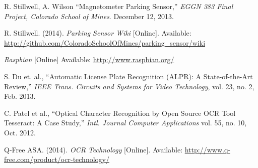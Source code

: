 \documentclass[11pt, oneside, fullpage, doublespace]{article}
\begin{document}
\begin{thebibliography}{99}
 R. Stillwell, A. Wilson ``Magnetometer Parking Sensor,'' \emph{EGGN 383 Final Project, Colorado School of Mines}. December 12, 2013.

 R. Stillwell. (2014). \emph{Parking Sensor Wiki} [Online]. Available: \url{http://github.com/ColoradoSchoolOfMines/parking_sensor/wiki}

 \emph{Raspbian} [Online] Available: \url{http://www.raspbian.org/}

 S. Du et. al., ``Automatic License Plate Recognition (ALPR): A State-of-the-Art Review,'' \emph{IEEE Trans. Circuits and Systems for Video Technology}, vol. 23, no. 2, Feb. 2013.

 C. Patel et al., ``Optical Character Recognition by Open Source OCR Tool Tesseract: A Case Study,'' \emph{Intl. Journal Computer Applications} vol. 55, no. 10, Oct. 2012.

 Q-Free ASA. (2014). \emph{OCR Technology} [Online]. Available: \url{http://www.q-free.com/product/ocr-technology/}

\end{thebibliography}
\end{document}
